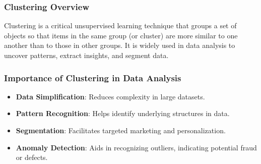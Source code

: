 \documentclass[aspectratio=169]{beamer}
\begin{document}
\begin{frame}[fragile]
    \frametitle{Clustering Overview}
    Clustering is a critical unsupervised learning technique that groups a set of objects so that items in the same group (or cluster) are more similar to one another than to those in other groups. It is widely used in data analysis to uncover patterns, extract insights, and segment data.
\end{frame}

\begin{frame}[fragile]
    \frametitle{Importance of Clustering in Data Analysis}
    \begin{itemize}
        \item \textbf{Data Simplification}: Reduces complexity in large datasets.
        \item \textbf{Pattern Recognition}: Helps identify underlying structures in data.
        \item \textbf{Segmentation}: Facilitates targeted marketing and personalization.
        \item \textbf{Anomaly Detection}: Aids in recognizing outliers, indicating potential fraud or defects.
    \end{itemize}
\end{frame}
\end{document}

